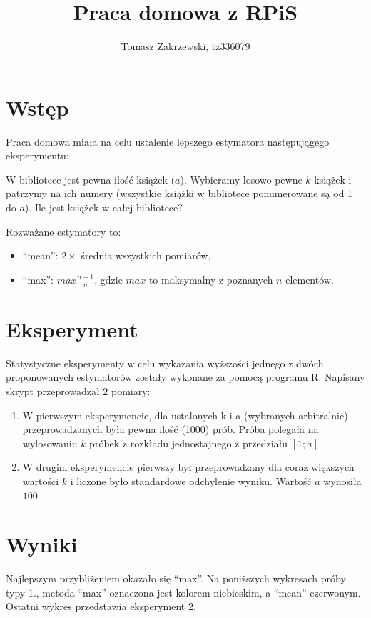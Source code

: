 \documentclass[a4paper,10pt]{article}
\author{Tomasz Zakrzewski, tz336079}
\title{Praca domowa z RPiS}
\begin{document}
\maketitle

\section{Wstęp}
Praca domowa miała na celu ustalenie lepszego estymatora następujągego eksperymentu:

W bibliotece jest pewna ilość książek ($a$). Wybieramy losowo pewne $k$ książek i patrzymy na ich numery 
(wszystkie książki w bibliotece ponumerowane są od 1 do $a$). Ile jest książek w całej bibliotece?

Rozważane estymatory to:
\begin{itemize}
 \item ``mean'': $2 \times$ średnia wszystkich pomiarów,
 \item ``max'': $max \frac{n + 1}{n}$, gdzie $max$ to maksymalny z poznanych $n$ elementów. 
\end{itemize}

\section{Eksperyment}
Statystyczne eksperymenty w celu wykazania wyższości jednego z dwóch proponowanych estymatorów zostały wykonane za pomocą programu R.
Napisany skrypt przeprowadzał 2 pomiary:
\begin{enumerate}
 \item W pierwszym eksperymencie, dla ustalonych k i a (wybranych arbitralnie) przeprowadzanych była pewna ilość (1000) prób. Próba polegała na 
 wylosowaniu $k$ próbek z rozkładu jednostajnego z przedziału $[1; a]$
 \item W drugim eksperymencie pierwszy był przeprowadzany dla coraz większych wartości $k$ i liczone było standardowe odchylenie wyniku. Wartość
 $a$ wynosiła $100$.
\end{enumerate}

\section{Wyniki}
Najlepszym przybliżeniem okazało się ``max''.
Na poniższych wykresach próby typy 1., metoda ``max'' oznaczona jest kolorem niebieskim, a ``mean'' czerwonym. Ostatni wykres przedstawia
eksperyment 2.
\end{document}
